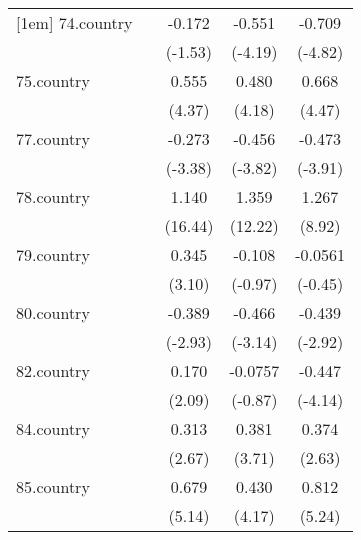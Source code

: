 {\begin{tabular}{l*{4}{c}}
[1em]
74.country  &                     &      -0.172         &      -0.551\sym{***}&      -0.709\sym{***}\\
            &                     &     (-1.53)         &     (-4.19)         &     (-4.82)         \\
[1em]
75.country  &                     &       0.555\sym{***}&       0.480\sym{***}&       0.668\sym{***}\\
            &                     &      (4.37)         &      (4.18)         &      (4.47)         \\
[1em]
77.country  &                     &      -0.273\sym{***}&      -0.456\sym{***}&      -0.473\sym{***}\\
            &                     &     (-3.38)         &     (-3.82)         &     (-3.91)         \\
[1em]
78.country  &                     &       1.140\sym{***}&       1.359\sym{***}&       1.267\sym{***}\\
            &                     &     (16.44)         &     (12.22)         &      (8.92)         \\
[1em]
79.country  &                     &       0.345\sym{**} &      -0.108         &     -0.0561         \\
            &                     &      (3.10)         &     (-0.97)         &     (-0.45)         \\
[1em]
80.country  &                     &      -0.389\sym{**} &      -0.466\sym{**} &      -0.439\sym{**} \\
            &                     &     (-2.93)         &     (-3.14)         &     (-2.92)         \\
[1em]
82.country  &                     &       0.170\sym{*}  &     -0.0757         &      -0.447\sym{***}\\
            &                     &      (2.09)         &     (-0.87)         &     (-4.14)         \\
[1em]
84.country  &                     &       0.313\sym{**} &       0.381\sym{***}&       0.374\sym{**} \\
            &                     &      (2.67)         &      (3.71)         &      (2.63)         \\
[1em]
85.country  &                     &       0.679\sym{***}&       0.430\sym{***}&       0.812\sym{***}\\
            &                     &      (5.14)         &      (4.17)         &      (5.24)         \\

\end{tabular}}
